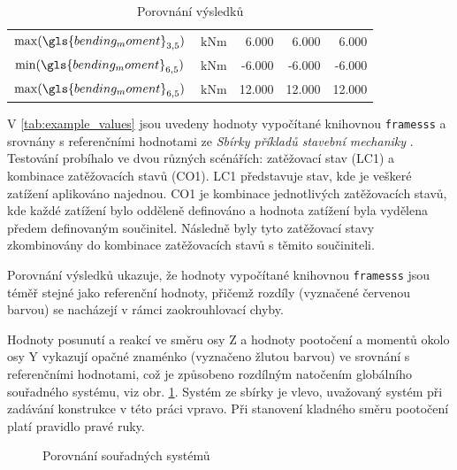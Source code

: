 \begin{table}[H]
\begin{tabular}{ccrrr}
            $\max(\gls{bending_moment}_{3,5})$ & $\SI{}{\kilo\newton\meter}$ & 6.000 & 6.000 & 6.000 \\
            $\min(\gls{bending_moment}_{6,5})$ & $\SI{}{\kilo\newton\meter}$ & -6.000 & -6.000 & -6.000 \\
            $\max(\gls{bending_moment}_{6,5})$ & $\SI{}{\kilo\newton\meter}$ & 12.000 & 12.000 & 12.000 
    \end{tabular}
    \caption{Porovnání výsledků}
    \label{tab:example_values}
\end{table}

V \autoref{tab:example_values} jsou uvedeny hodnoty vypočítané knihovnou \texttt{framesss} a srovnány s referenčními hodnotami ze \textit{Sbírky příkladů stavební mechaniky} \cite{sbirka_prikladu}. Testování probíhalo ve dvou různých scénářích: zatěžovací stav (LC1) a kombinace zatěžovacích stavů (CO1). LC1 představuje stav, kde je veškeré zatížení aplikováno najednou. CO1 je kombinace jednotlivých zatěžovacích stavů, kde každé zatížení bylo odděleně definováno a hodnota zatížení byla vydělena předem definovaným součinitel. Následně byly tyto zatěžovací stavy zkombinovány do kombinace zatěžovacích stavů s těmito součiniteli.

Porovnání výsledků ukazuje, že hodnoty vypočítané knihovnou \texttt{framesss} jsou téměř stejné jako referenční hodnoty, přičemž rozdíly (vyznačené \colorbox{red!8}{červenou barvou}) se nacházejí v rámci zaokrouhlovací chyby.

Hodnoty posunutí a reakcí ve směru osy \gls{Z} a hodnoty pootočení a momentů okolo osy \gls{Y} vykazují opačné znaménko (vyznačeno \colorbox{yellow!15}{žlutou barvou}) ve srovnání s referenčními hodnotami, což je způsobeno rozdílným natočením globálního souřadného systému, viz obr. \ref{fig:example_coordinate_systems}. Systém ze sbírky je vlevo, uvažovaný systém při zadávání konstrukce v této práci vpravo. Při stanovení kladného směru pootočení platí pravidlo pravé ruky.

\begin{figure}[H]
    
    \caption{Porovnání souřadných systémů}
    \label{fig:example_coordinate_systems}
\end{figure}

